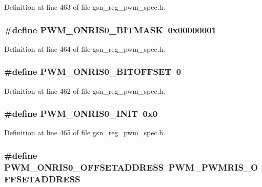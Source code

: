 Definition at line 463 of file gsn\_\-reg\_\-pwm\_\-spec.h.

\hypertarget{a00565_aa1b799cb72a3ad42549f2294d6f3bf48}{
\subsubsection[{PWM\_\-ONRIS0\_\-BITMASK}]{\setlength{\rightskip}{0pt plus 5cm}\#define PWM\_\-ONRIS0\_\-BITMASK~0x00000001}}
\label{a00565_aa1b799cb72a3ad42549f2294d6f3bf48}


Definition at line 464 of file gsn\_\-reg\_\-pwm\_\-spec.h.

\hypertarget{a00565_aa14bb3a0925508c8e3ae6935998725e8}{
\subsubsection[{PWM\_\-ONRIS0\_\-BITOFFSET}]{\setlength{\rightskip}{0pt plus 5cm}\#define PWM\_\-ONRIS0\_\-BITOFFSET~0}}
\label{a00565_aa14bb3a0925508c8e3ae6935998725e8}


Definition at line 462 of file gsn\_\-reg\_\-pwm\_\-spec.h.

\hypertarget{a00565_af1203aa729f79270e6cdfef4bc9e9e90}{
\subsubsection[{PWM\_\-ONRIS0\_\-INIT}]{\setlength{\rightskip}{0pt plus 5cm}\#define PWM\_\-ONRIS0\_\-INIT~0x0}}
\label{a00565_af1203aa729f79270e6cdfef4bc9e9e90}


Definition at line 465 of file gsn\_\-reg\_\-pwm\_\-spec.h.

\hypertarget{a00565_ac4aa2fe5ef4a803d111d50d3c33cc09d}{
\subsubsection[{PWM\_\-ONRIS0\_\-OFFSETADDRESS}]{\setlength{\rightskip}{0pt plus 5cm}\#define PWM\_\-ONRIS0\_\-OFFSETADDRESS~PWM\_\-PWMRIS\_\-OFFSETADDRESS}}
\label{a00565_ac4aa2fe5ef4a803d111d50d3c33cc09d}


